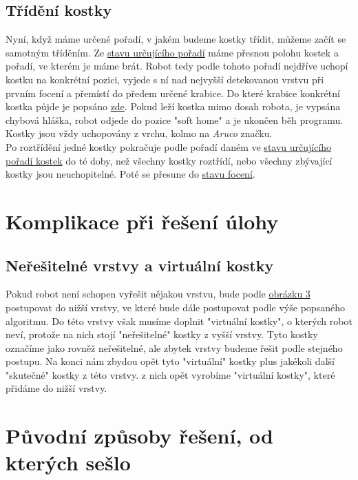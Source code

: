 \documentclass[journal,twoside,web]{ieeecolor}
\begin{document}
        \subsection{Třídění kostky}
            Nyní, když máme určené pořadí, v jakém budeme kostky třídit, můžeme začít se samotným tříděním.
            Ze \hyperlink{layer_sort}{stavu určujícího pořadí} máme přesnou polohu kostek a
            pořadí, ve kterém je máme brát. Robot tedy podle tohoto pořadí nejdříve uchopí kostku na konkrétní pozici, vyjede
            s ní nad nejvyšší detekovanou vrstvu při prvním focení a přemístí do předem určené krabice. 
            Do které krabice konkrétní kostka půjde je popsáno \hyperlink{stav_detekce_krabic}{zde}. Pokud leží kostka mimo dosah robota,
            je vypsána chybová hláška, robot odjede do pozice "soft home" a je ukončen běh programu. Kostky jsou vždy uchopovány z vrchu, kolmo na
            \textit{Aruco} značku.\\
            Po roztřídění jedné kostky pokračuje podle pořadí daném ve \hyperlink{layer_sort}{stavu určujícího pořadí kostek} do té doby,
            než všechny kostky roztřídí, nebo všechny zbývající kostky jsou neuchopitelné. Poté se přesune do \hyperlink{capturing_state}{stavu focení}.

    \section{Komplikace při řešení úlohy}
        \subsection{Neřešitelné vrstvy a virtuální kostky}
            Pokud robot není schopen vyřešit nějakou vrstvu, bude podle \hyperlink{diagram1}{obrázku 3} postupovat do nižší vrstvy,
            ve které bude dále postupovat podle výše popsaného algoritmu. Do této vrstvy však musíme doplnit "virtuální kostky",
            o kterých robot neví, protože na nich stojí "neřešitelné" kostky z vyšší vrstvy. Tyto kostky označíme
            jako rovněž neřešitelné, ale zbytek vrstvy budeme řešit podle stejného postupu. Na konci nám zbydou opět tyto "virtuální"
            kostky plus jakékoli další "skutečné" kostky z této vrstvy. z nich opět vyrobíme "virtuální kostky", které
            přidáme do nižší vrstvy.



    \section{Původní způsoby řešení, od kterých sešlo}
\end{document}
